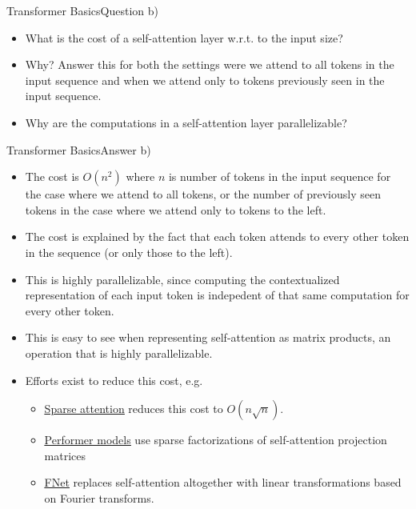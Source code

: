 \documentclass[t]{beamer}
\begin{document}
\begin{frame}{Transformer Basics}{Question b)}
    \begin{itemize}
        \item What is the cost of a self-attention layer w.r.t. to the input
              size?
        \item Why? Answer this for both the settings were we attend to all
              tokens in the input sequence and when we attend only to tokens
              previously seen in the input sequence.
        \item Why are the computations in a self-attention layer parallelizable?
    \end{itemize}
\end{frame}

\begin{frame}{Transformer Basics}{Answer b)}
    \begin{itemize}
        \item The cost is $O(n^2)$ where $n$ is number of tokens in the input
              sequence for the case where we attend to all tokens, or the number
              of previously seen tokens in the case where we attend only to
              tokens to the left.
              \pause
        \item The cost is explained by the fact that each token attends to every
              other token in the sequence (or only those to the left).
              \pause
        \item This is highly parallelizable, since computing the contextualized
              representation of each input token is indepedent of that same
              computation for every other token.
              \pause
        \item This is easy to see when representing self-attention as matrix
              products, an operation that is highly parallelizable.
              \pause
        \item Efforts exist to reduce this cost, e.g.\
              \begin{itemize}
                  \item \href{https://arxiv.org/pdf/1904.10509v1.pdf}{\underline{Sparse attention}}
                        reduces this cost to $O(n\sqrt{n})$.
                  \item \href{https://arxiv.org/pdf/2009.14794.pdf}{\underline{Performer models}}
                        use sparse factorizations of self-attention projection
                        matrices
                  \item \href{https://arxiv.org/pdf/2105.03824.pdf}{\underline{FNet}}
                        replaces self-attention altogether with linear
                        transformations based on Fourier transforms.
              \end{itemize}
    \end{itemize}
\end{frame}
\end{document}
